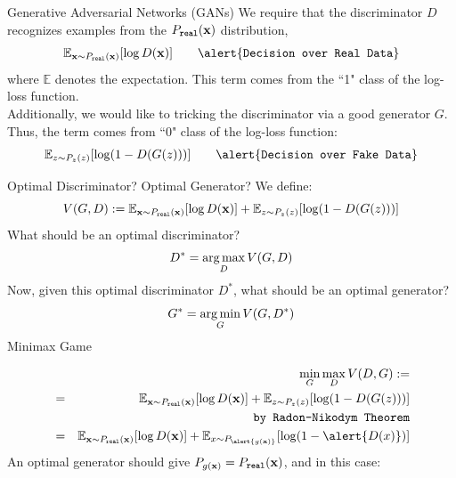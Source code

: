 \documentclass[xcolor=pdftex,dvipsnames,table,mathserif]{beamer}
\begin{document}
\begin{frame}{Generative Adversarial Networks (GANs)}
We require that the discriminator $D$ recognizes examples from the $P_{\texttt{real}}(\mathbf{x})$ distribution,
\begin{equation*}
\mathbb{E}_{\x \sim P_{\texttt{real}}(\x)}[\log D(\x)]  \quad \quad \alert{\texttt{Decision over Real Data}}
\end{equation*} where $\mathbb{E}$ denotes the expectation. This term comes from the ``1" class  of the log-loss function. \\
Additionally, we would like to tricking the discriminator via a good generator $G$. Thus, the term comes from  ``0" class of the log-loss function:
\begin{equation*}
\mathbb{E}_{z \sim P_{z}(z)}[ \log (1-D(G(z)))]  \quad \quad  \alert{\texttt{Decision over Fake Data}}
\end{equation*}
\end{frame}

\begin{frame}{Optimal Discriminator? Optimal Generator?}
We define:
\begin{equation*}
V(G,D):= \mathbb{E}_{\mathbf{x} \sim P_{\texttt{real}}(\mathbf{x})}[\log D(\mathbf{x})] + \mathbb{E}_{z \sim P_{z}(z)}[ \log (1-D(G(z)))]
\end{equation*}
What should be an optimal discriminator? \pause
\begin{equation*}
D^* = \operatorname*{arg\,max}_{D} V(G,D)
\end{equation*}
Now, given this optimal discriminator $D^*$, what should be an optimal generator? \pause
\begin{equation*}
G^* = \operatorname*{arg\,min}_{G} V(G,D^*)
\end{equation*}
Minimax Game \cite{}
\end{frame}

\begin{frame}
\begin{eqnarray*}
&& \min_{G} \max _{D} V(D,G) := \\
&= &\mathbb{E}_{\x \sim P_{\texttt{real}}(\x)}[\log D(\x)]  + \mathbb{E}_{z \sim P_{z}(z)}[ \log (1-D(G(z)))]  \\
&&\texttt{by Radon-Nikodym Theorem} \\
&=& \mathbb{E}_{\x \sim P_{\texttt{real}}(\x)}[\log D(\x)]  + \mathbb{E}_{x \sim P_{\alert{{g}(\x)}}}[ \log (1-\alert{D(x)})]  
\end{eqnarray*}
An optimal generator should give $P_{g(\mathbf{x})}=P_{\texttt{real}}(\mathbf{x})$, and in this case:


\begin{equation}
\end{equation}
\end{frame}
\end{document}

